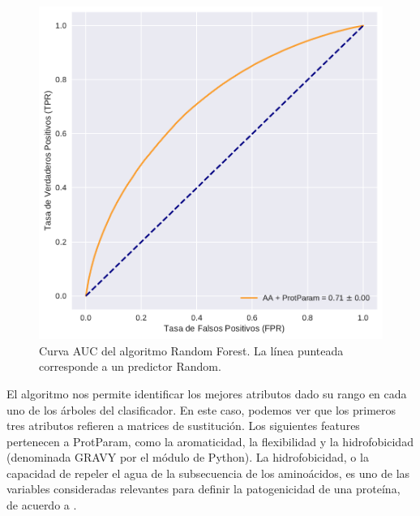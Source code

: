 
\begin{figure}[H]
    \centering
    \includegraphics[scale=0.73]{documents/latex/figures/3/auc_1.pdf}
    \caption{Curva AUC del algoritmo Random Forest. La línea punteada corresponde a un predictor Random.}
    \label{fig:auc_1}
\end{figure}




El algoritmo nos permite identificar los mejores atributos dado su rango en cada uno de los árboles del clasificador. En este caso, podemos ver que los primeros tres atributos refieren a matrices de sustitución. Los siguientes features pertenecen a ProtParam, como la aromaticidad, la flexibilidad y la hidrofobicidad (denominada GRAVY por el módulo de Python). La hidrofobicidad, o la capacidad de repeler el agua de la subsecuencia de los aminoácidos, es uno de las variables consideradas relevantes para definir la patogenicidad de una proteína, de acuerdo a \cite{Wang2016}.

